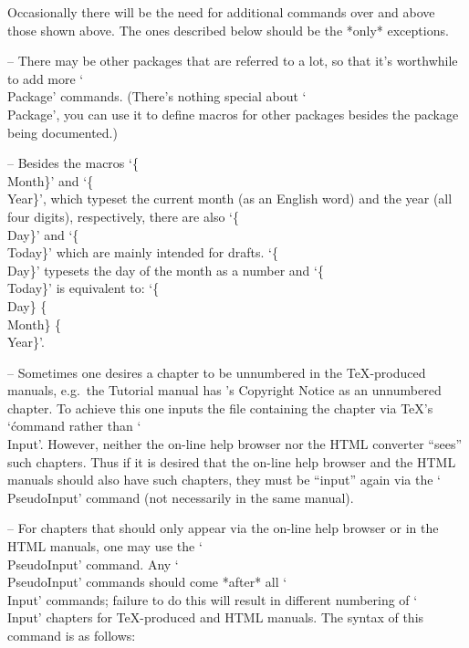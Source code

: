\indextt{\\PseudoInput}\indextt{\\Day}\indextt{\\Month}\indextt{\\Year}
\indextt{\\Today}
Occasionally there will be the need  for  additional  commands  over  and
above those shown above. The ones described below should  be  the  *only*
exceptions.
\beginlist%

\item{--}
There may be other packages that are referred to  a  lot,  so  that  it's
worthwhile to add more `\\Package'  commands.  (There's  nothing  special
about `\\Package', you can use it to define  macros  for  other  packages
besides the package being documented.)

\item{--}
Besides the macros `\{\\Month\}'  and  `\{\\Year\}',  which  typeset  the
current month (as an English  word)  and  the  year  (all  four  digits),
respectively, there are also  `\{\\Day\}'  and  `\{\\Today\}'  which  are
mainly intended for drafts. `\{\\Day\}' typesets the day of the month  as
a number and  `\{\\Today\}'  is  equivalent  to:  `\{\\Day\}  \{\\Month\}
\{\\Year\}'.

\item{--}
Sometimes one desires a chapter to be unnumbered in  the  {\TeX}-produced
manuals, e.g.~the Tutorial manual has {\GAP}'s  Copyright  Notice  as  an
unnumbered chapter. To achieve this one inputs the  file  containing  the
chapter via {\TeX}'s `\' command rather  than  `\\Input'.  However,
neither the on-line help browser nor the  HTML  converter  ``sees''  such
chapters. Thus if it is desired that the on-line  help  browser  and  the
HTML manuals should also have such chapters, they must be ``input'' again
via the `\\PseudoInput' command (not necessarily in the same manual).

\item{--}
For chapters that should only appear via the on-line help browser  or  in
the  HTML  manuals,  one  may  use  the  `\\PseudoInput'   command.   Any
`\\PseudoInput'  commands should come  *after*  all  `\\Input'  commands;
failure to do this  will  result  in  different  numbering  of  `\\Input'
chapters for {\TeX}-produced and HTML manuals. The syntax of this command
is as follows:

